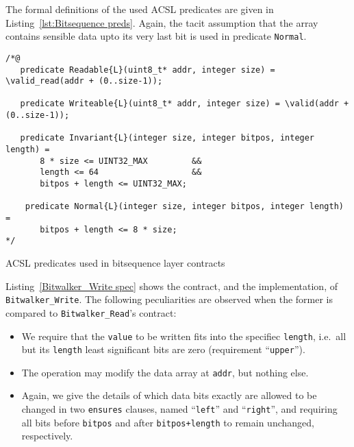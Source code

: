 The formal definitions of the used ACSL predicates are given in
Listing~\ref{lst:Bitsequence preds}.
%
Again, the tacit assumption that the array contains sensible data upto its very last bit
is used in predicate \lstinline{Normal}.









\begin{listing}[hbt]
\begin{minipage}{0.99\textwidth}
\begin{lstlisting}[style=acsl-block]
/*@
   predicate Readable{L}(uint8_t* addr, integer size) = \valid_read(addr + (0..size-1));

   predicate Writeable{L}(uint8_t* addr, integer size) = \valid(addr + (0..size-1));

   predicate Invariant{L}(integer size, integer bitpos, integer length) =
       8 * size <= UINT32_MAX         &&
       length <= 64                   &&
       bitpos + length <= UINT32_MAX;

    predicate Normal{L}(integer size, integer bitpos, integer length) =
       bitpos + length <= 8 * size;
*/
\end{lstlisting}
\end{minipage}
\caption{\label{lst:Bitsequence preds} ACSL predicates used in bitsequence layer contracts}
\end{listing}





Listing~\ref{Bitwalker_Write spec} shows the contract, and the implementation, of
\lstinline{Bitwalker_Write}.
%
The following peculiarities are observed when the former is
compared to \lstinline{Bitwalker_Read}'s contract:
%
\begin{itemize}
\item We require that the \lstinline{value} to be written fits into the specifiec
	\lstinline{length}, i.e.\ all but its \lstinline{length} least significant bits are
	zero (requirement ``\lstinline{upper}'').
\item The operation may modify the data array at \lstinline{addr}, but nothing else.
\item Again, we give the details of which data bits exactly
	are allowed to be changed in two
	\lstinline{ensures} clauses, named ``\lstinline{left}'' and
	``\lstinline{right}'', and requiring all bits before \lstinline{bitpos} and after
	\lstinline{bitpos+length} to remain unchanged, respectively.
\end{itemize}

